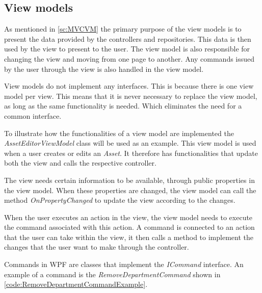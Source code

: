 \subsection{View models} \label{sc:ViewModels}
As mentioned in \autoref{sc:MVCVM} the primary purpose of the view models is to present the data provided by the controllers and repositories. This data is then used by the view to present to the user. The view model is also responsible for changing the view and moving from one page to another. Any commands issued by the user through the view is also handled in the view model. 
\par 
View models do not implement any interfaces. This is because there is one view model per view. This means that it is never necessary to replace the view model, as long as the same functionality is needed. Which eliminates the need for a common interface.
\par
To illustrate how the functionalities of a view model are implemented the \textit{AssetEditorViewModel} class will be used as an example. This view model is used when a user creates or edits an \textit{Asset}. It therefore has functionalities that update both the view and calls the respective controller. 
\par
The view needs certain information to be available, through public properties in the view model. When these properties are changed, the view model can call the method \textit{OnPropertyChanged} to update the view according to the changes. 
\par
When the user executes an action in the view, the view model needs to execute the command associated with this action. A command is connected to an action that the user can take within the view, it then calls a method to implement the changes that the user want to make through the controller. \par
Commands in WPF are classes that implement the \textit{ICommand} interface. 
An example of a command is the \textit{RemoveDepartmentCommand} shown in \autoref{code:RemoveDepartmentCommandExample}.

